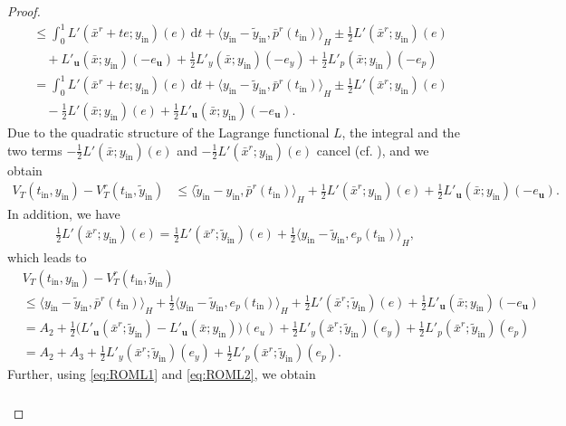 \documentclass{m2an}
\newcommand{\bu}{\mathbf{u}}
\newcommand{\dt}{\mathrm{d}t}
\newcommand{\tint}{t_{\mathrm{in}}}
\newcommand{\yint}{y_{\mathrm{in}}}
\newcommand{\tildeyint}{\tilde y_{\mathrm{in}}}
\begin{document}
\begin{proof}
\begin{align*}
        &\leq \int_0^1 L'(\bar x^r+t e;\yint)(e)\,\dt+{\langle \yint- {\tildeyint}, \bar p^r(\tint)\rangle}_H\pm \tfrac{1}{2}L'(\bar x^r;\yint)(e)\\
         &\quad+L'_{\bu}(\bar x;\yint)(-e_\bu)+\tfrac{1}{2}L'_y(\bar x;\yint)(-e_y)+\tfrac{1}{2}L'_p(\bar x;\yint)(-e_p)\\
        &=\int_0^1 L'(\bar x^r+t e;\yint)(e)\,\dt+{\langle \yint-{\tildeyint}, \bar p^r(\tint)\rangle}_H\pm \tfrac{1}{2}L'(\bar x^r;\yint)(e)\\
         &\quad-\tfrac{1}{2} L'(\bar x;\yint)(e)+\tfrac{1}{2}L'_{\bu}(\bar x;\yint)(-e_\bu).
    \end{align*}
    Due to the quadratic structure of the Lagrange functional $L$, the integral and the two terms $-\tfrac{1}{2}L'(\bar x;\yint)(e)$ and $-\tfrac{1}{2}L'(\bar x^r;\yint)(e)$ cancel (cf. \cite{ran}), and we obtain
    \begin{align*}
       V_T(\tint,\yint)- V^r_T(\tint,\tildeyint)
        &\leq {\langle {\tildeyint}-\yint,\bar p^r(\tint)\rangle}_H+\tfrac{1}{2}L'(\bar x^r;\yint)(e)+\tfrac{1}{2}L'_{\bu}(\bar x; \yint)(-e_\bu).
    \end{align*}
    In addition, we have
    \begin{align} \label{eq:valueapost_helper4}
        \tfrac{1}{2}L'(\bar { x}^r;\yint)(e) = \tfrac{1}{2}L'(\bar { x}^r; \tildeyint)(e) + \tfrac{1}{2}{\langle \yint- { \tildeyint},e_p(\tint)\rangle}_H,
    \end{align}
    which leads to
    \begin{align*}
        &V_T(\tint,\yint)- V^r_T(\tint,\tildeyint)\\
        &\leq{\langle \yint-{\tildeyint}, \bar { p}^r(\tint)\rangle}_H + \tfrac{1}{2} {\langle \yint- {\tildeyint},e_p(\tint)\rangle}_H
        + \tfrac{1}{2}L'(\bar x^r; \tildeyint)(e) + \tfrac{1}{2}L'_{\bu}(\bar x; \yint)(-e_\bu)\\
        &=A_2
        + \tfrac{1}{2}\big(L'_{\bu}(\bar x^r; \tildeyint)-L'_{\bu}(\bar x; \yint)\big)(e_u)
+ \tfrac{1}{2}L'_y(\bar x^r; \tildeyint)(e_y)+\tfrac{1}{2}L'_p(\bar x^r; \tildeyint)(e_p)\\
        &= A_2+ A_3+\tfrac{1}{2}L'_y(\bar x^r; \tildeyint)(e_y)+\tfrac{1}{2}L'_p(\bar x^r; \tildeyint)(e_p).
    \end{align*}
    Further, using \eqref{eq:ROML1} and \eqref{eq:ROML2}, we obtain 
    \begin{align}
        \label{eq:valueapost_helper5}
        \begin{aligned}

\end{aligned}
\end{align}
\end{proof}
\end{document}
